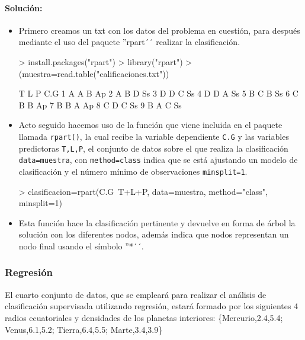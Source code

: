 \documentclass[a4paper, 12pt]{article}
\begin{document}
	\paragraph{Solución:}
	\begin{itemize}
	  \item Primero creamos un txt con los datos del problema en cuestión, para después mediante el uso del paquete ''rpart´´ realizar la clasificación.
\begin{Schunk}
\begin{Sinput}
> install.packages("rpart")
> library("rpart")
> (muestra=read.table("calificaciones.txt"))
\end{Sinput}
\begin{Soutput}
  T L P C.G
1 A A B  Ap
2 A B D  Ss
3 D D C  Ss
4 D D A  Ss
5 B C B  Ss
6 C B B  Ap
7 B B A  Ap
8 C D C  Ss
9 B A C  Ss
\end{Soutput}
\end{Schunk}

    	  \item Acto seguido hacemos uso de la función que viene incluida en el paquete llamada \texttt{rpart()}, la cual recibe la variable dependiente \texttt{C.G} y las variables predictoras \texttt{T,L,P}, el conjunto de datos sobre el que realiza la clasificación \texttt{data=muestra}, con \texttt{method=class} indica que se está ajustando un modelo de clasificación y el número mínimo de observaciones \texttt{minsplit=1}.
\begin{Schunk}
\begin{Sinput}
> clasificacion=rpart(C.G~T+L+P, data=muestra, method="class", minsplit=1)
\end{Sinput}
\end{Schunk}

    	  \item Esta función hace la clasificación pertinente y devuelve en forma de árbol la solución con los diferentes nodos, además indica que nodos representan un nodo final usando el símbolo ''*´´.
    
  	\end{itemize}
	
	\subsubsection{Regresión}
	
	El cuarto conjunto de datos, que se empleará para realizar el análisis de clasificación supervisada utilizando regresión, estará formado por los siguientes 4 radios ecuatoriales y densidades de los planetas interiores: \{Mercurio,2.4,5.4; Venus,6.1,5.2; Tierra,6.4,5.5; Marte,3.4,3.9\}
	
\end{document}
